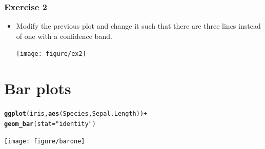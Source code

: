 \documentclass{beamer}\usepackage[]{graphicx}\usepackage[]{color}
\makeatletter
\newcommand{\hlstr}[1]{\textcolor[rgb]{0.192,0.494,0.8}{#1}}%
\newcommand{\hlkwd}[1]{\textcolor[rgb]{0.737,0.353,0.396}{\textbf{#1}}}%
\newenvironment{kframe}{%
 \def\at@end@of@kframe{}%
 \ifinner\ifhmode%
  \def\at@end@of@kframe{\end{minipage}}%
  \begin{minipage}{\columnwidth}%
 \fi\fi%
 \def\FrameCommand##1{\hskip\@totalleftmargin \hskip-\fboxsep
 \colorbox{shadecolor}{##1}\hskip-\fboxsep
     \hskip-\linewidth \hskip-\@totalleftmargin \hskip\columnwidth}%
 \MakeFramed {\advance\hsize-\width
   \@totalleftmargin\z@ \linewidth\hsize
   \@setminipage}}%
 {\par\unskip\endMakeFramed%
 \at@end@of@kframe}
\newenvironment{knitrout}{}{} %
\makeatother
\begin{document}

\begin{frame}[fragile]
\frametitle{Exercise 2}
\begin{itemize}
\item Modify the previous plot and change it such that there are three lines instead of one with a confidence band.
\begin{knitrout}\footnotesize
{}\color{fgcolor}

{\centering \texttt{[image: figure/ex2]} 

}



\end{knitrout}


\end{itemize}
\end{frame}


\section*{Bar plots}
\frame{\sectionpage}


\begin{frame}[fragile]
\begin{knitrout}\footnotesize
{}\color{fgcolor}\begin{kframe}
\begin{alltt}
\hlkwd{ggplot}(iris, \hlkwd{aes}(Species, Sepal.Length)) +
\hlkwd{geom_bar}(stat = \hlstr{"identity"})
\end{alltt}
\end{kframe}

{\centering \texttt{[image: figure/barone]} 

}



\end{knitrout}

\end{frame}

\end{document}
